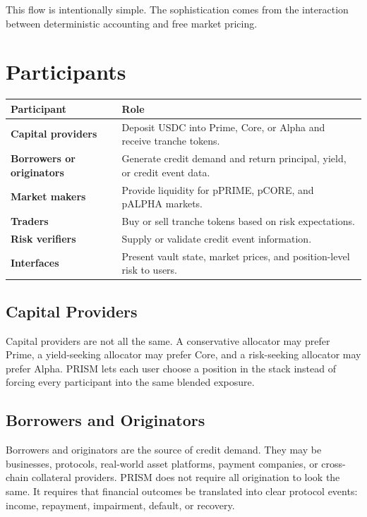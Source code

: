 \documentclass[11pt]{article}
\begin{document}
This flow is intentionally simple. The sophistication comes from the interaction
between deterministic accounting and free market pricing.

\section{Participants}

\begin{center}
\begin{tabular}{>{\bfseries}p{}p{}}
\toprule
Participant & Role \\
\midrule
Capital providers & Deposit USDC into Prime, Core, or Alpha and receive tranche tokens. \\
Borrowers or originators & Generate credit demand and return principal, yield, or credit event data. \\
Market makers & Provide liquidity for pPRIME, pCORE, and pALPHA markets. \\
Traders & Buy or sell tranche tokens based on risk expectations. \\
Risk verifiers & Supply or validate credit event information. \\
Interfaces & Present vault state, market prices, and position-level risk to users. \\
\bottomrule
\end{tabular}
\end{center}

\subsection{Capital Providers}

Capital providers are not all the same. A conservative allocator may prefer
Prime, a yield-seeking allocator may prefer Core, and a risk-seeking allocator
may prefer Alpha. PRISM lets each user choose a position in the stack instead of
forcing every participant into the same blended exposure.

\subsection{Borrowers and Originators}

Borrowers and originators are the source of credit demand. They may be
businesses, protocols, real-world asset platforms, payment companies, or
cross-chain collateral providers. PRISM does not require all origination to look
the same. It requires that financial outcomes be translated into clear protocol
events: income, repayment, impairment, default, or recovery.
\end{document}
